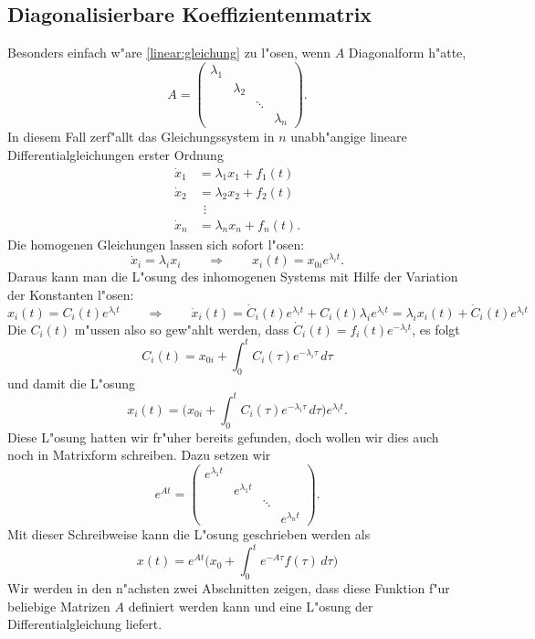 \subsection{Diagonalisierbare Koeffizientenmatrix}
Besonders einfach w"are \eqref{linear:gleichung} zu l"osen, wenn $A$
Diagonalform h"atte,
\[
A=\begin{pmatrix}
\lambda_1&         &      &         \\
         &\lambda_2&      &         \\
         &         &\ddots&         \\
         &         &      &\lambda_n
\end{pmatrix}.
\]
%
In diesem Fall zerf"allt das Gleichungssystem in $n$ unabh"angige
lineare Differentialgleichungen erster Ordnung
\begin{align*}
\dot{x}_1&=\lambda_1x_1 + f_1(t)\\
\dot{x}_2&=\lambda_2x_2 + f_2(t)\\
&\;\,\vdots\\
\dot{x}_n&=\lambda_nx_n + f_n(t).
\end{align*}
Die homogenen Gleichungen lassen sich sofort l"osen:
\[
\dot{x}_i=\lambda_ix_i
\qquad
\Rightarrow
\qquad
x_i(t)=x_{0i}e^{\lambda_it}.
\]
Daraus kann man die L"osung des inhomogenen Systems mit Hilfe der
Variation der Konstanten l"osen:
\[
x_i(t)=C_i(t)e^{\lambda_i t}
\qquad
\Rightarrow
\qquad
\dot{x}_i(t)
=
\dot{C}_i(t)e^{\lambda_i t}+C_i(t)\lambda_ie^{\lambda_i t}
=
\lambda_i x_i(t) + \dot{C}_i(t)e^{\lambda_i t}
\]
Die $C_i(t)$ m"ussen also so gew"ahlt werden, dass
$\dot{C}_i(t)=f_i(t)e^{-\lambda_i t}$, es folgt
\[
C_i(t)=x_{0i}+\int_0^t C_i(\tau)e^{-\lambda_i \tau}\,d\tau
\]
und damit die L"osung
\[
x_i(t)
=
\biggl(x_{0i}+\int_0^t C_i(\tau)e^{-\lambda_i \tau}\,d\tau\biggr)
e^{\lambda_i t}.
\]
Diese L"osung hatten wir fr"uher bereits gefunden, doch wollen wir
dies auch noch in Matrixform schreiben.
Dazu setzen wir
\[
e^{At}=\begin{pmatrix}
e^{\lambda_1 t}&               &      &               \\
               &e^{\lambda_1 t}&      &               \\
               &               &\ddots&               \\
               &               &      &e^{\lambda_n t}
\end{pmatrix}.
\]
Mit dieser Schreibweise kann die L"osung geschrieben werden als
\[
x(t)
=
e^{At}
\biggl(x_0 + \int_0^t e^{-A\tau}f(\tau)\,d\tau\biggr)
\]
Wir werden in den n"achsten zwei Abschnitten zeigen, dass diese 
Funktion f"ur beliebige Matrizen $A$ definiert werden kann und
eine L"osung der Differentialgleichung liefert.

